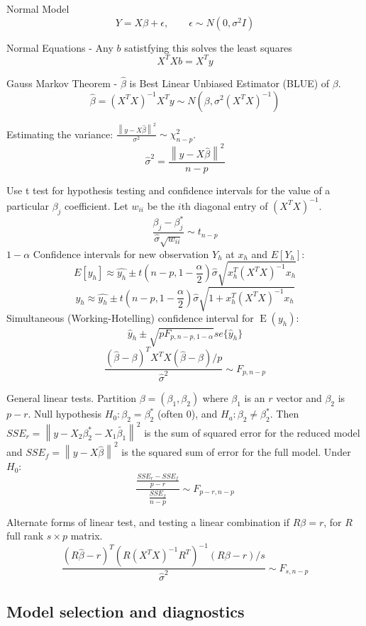 \documentclass[10pt, twocolumn]{article}
\newcommand{\norm}[1]{\left\lVert#1\right\rVert}
\newcommand{\Expect}{\operatorname{E}}
\begin{document}
Normal Model 
\[
    Y = X\beta + \epsilon, \qquad \epsilon \sim N(0, \sigma^2 I)
\]

Normal Equations - Any $b$ satistfying this solves the least squares
\[
    X^T X b = X^T y
\]

Gauss Markov Theorem - $\hat{\beta}$ is Best Linear Unbiased
Estimator (BLUE) of $\beta$.
\[
    \hat{\beta} = (X^T X)^{-1} X^T y \sim N(\beta, \sigma^2 (X^T X)^{-1})
\]

Estimating the variance: $\frac{\norm{y - X \hat{\beta}}^2}{\sigma^2} \sim
\chi^2_{n-p}$.
\[
    \hat{\sigma}^2 = \frac{\norm{y - X \hat{\beta}}^2}{n - p}
\]

Use t test for hypothesis testing and confidence intervals for the value of
a particular $\beta_j$ coefficient. 
Let $w_{ii}$ be the $i$th diagonal entry of $(X^T X)^{-1}$.
\[
    \frac{\beta_j - \beta_j^*}{\hat{\sigma} \sqrt{w_{ii}}} \sim t_{n-p}
\]
$1 - \alpha$ Confidence intervals for new observation $Y_h$ at $x_h$ and $E[Y_h]$:
\[
    E[y_h] \approx \hat{y_h} \pm t(n-p, 1 - \frac{\alpha}{2}) \hat{\sigma}
        \sqrt{x_h^T (X^T X)^{-1} x_h}
\]
\[
    y_h \approx \hat{y_h} \pm t(n-p, 1 - \frac{\alpha}{2}) \hat{\sigma}
        \sqrt{1 + x_h^T (X^T X)^{-1} x_h}
\]
Simultaneous (Working-Hotelling) confidence interval for $\Expect (y_h)$:
\[
    \hat{y}_h \pm \sqrt{p F_{p, n - p, 1 - \alpha}} se\{ \hat{y}_h \}
\]
\[
    \frac{(\hat{\beta} - \beta)^T X^T X (\hat{\beta} - \beta) /
    p}{\hat{\sigma}^2}
    \sim F_{p, n - p}
\]

General linear tests. Partition $\beta = (\beta_1, \beta_2)$ where $\beta_1$
is an $r$ vector and $\beta_2$ is $p - r$. Null hypothesis $H_0: \beta_2 =
\beta_2^*$ (often 0), and $H_a: \beta_2 \neq \beta_2^*$. Then
$SSE_r = \norm{y - X_2 \beta_2^* - X_1 \tilde{\beta_1}}^2$ is the sum of
squared error for the reduced model and 
$SSE_f = \norm{y - X \hat{\beta}}^2$ is the squared sum of error for the
full model.
Under $H_0$:
\[
    \frac{\frac{SSE_r - SSE_f}{p - r}}
         {\frac{SSE_f}{n - p}}
         \sim F_{p-r, n-p}
\]

Alternate forms of linear test, and testing a linear combination if $R\beta
= r$, for $R$ full rank $s \times p$ matrix.
\[
    \frac{(R \hat{\beta} - r)^T (R(X^T X)^{-1} R^T)^{-1} (R \beta - r) / s}
    {\hat{\sigma}^2} \sim F_{s, n-p}
\]


\subsection*{Model selection and diagnostics}
\end{document}
